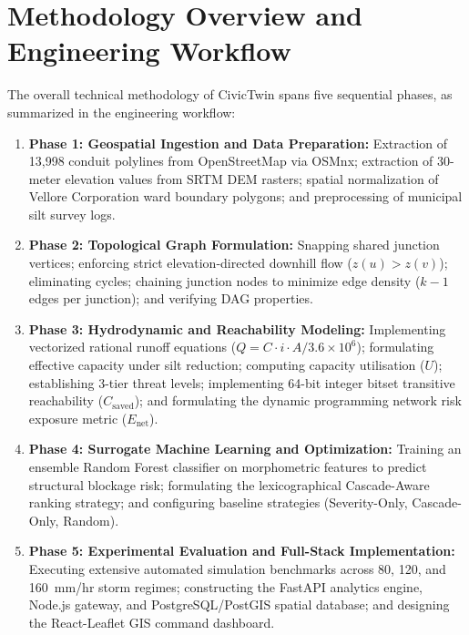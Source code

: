 \section{Methodology Overview and Engineering Workflow}
The overall technical methodology of CivicTwin spans five sequential phases, as summarized in the engineering workflow:
\begin{enumerate}
    \item \textbf{Phase 1: Geospatial Ingestion and Data Preparation:} Extraction of 13,998 conduit polylines from OpenStreetMap via OSMnx; extraction of 30-meter elevation values from SRTM DEM rasters; spatial normalization of Vellore Corporation ward boundary polygons; and preprocessing of municipal silt survey logs.
    \item \textbf{Phase 2: Topological Graph Formulation:} Snapping shared junction vertices; enforcing strict elevation-directed downhill flow ($z(u) > z(v)$); eliminating cycles; chaining junction nodes to minimize edge density ($k-1$ edges per junction); and verifying DAG properties.
    \item \textbf{Phase 3: Hydrodynamic and Reachability Modeling:} Implementing vectorized rational runoff equations ($Q = C \cdot i \cdot A / 3.6\times 10^6$); formulating effective capacity under silt reduction; computing capacity utilisation ($U$); establishing 3-tier threat levels; implementing 64-bit integer bitset transitive reachability ($C_{\text{saved}}$); and formulating the dynamic programming network risk exposure metric ($E_{\text{net}}$).
    \item \textbf{Phase 4: Surrogate Machine Learning and Optimization:} Training an ensemble Random Forest classifier on morphometric features to predict structural blockage risk; formulating the lexicographical Cascade-Aware ranking strategy; and configuring baseline strategies (Severity-Only, Cascade-Only, Random).
    \item \textbf{Phase 5: Experimental Evaluation and Full-Stack Implementation:} Executing extensive automated simulation benchmarks across 80, 120, and 160~mm/hr storm regimes; constructing the FastAPI analytics engine, Node.js gateway, and PostgreSQL/PostGIS spatial database; and designing the React-Leaflet GIS command dashboard.
\end{enumerate}

